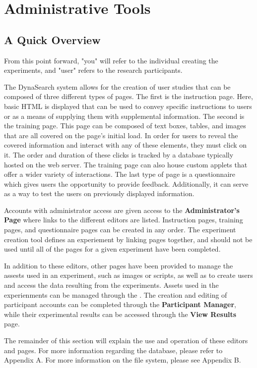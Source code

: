\documentclass[article]{ij4uq}              %
\begin{document}
\section{Administrative Tools}

\subsection{A Quick Overview}
From this point forward, "you" will refer to the individual creating the experiments, and "user" refers to the research participants. 

The DynaSearch system allows for the creation of user studies that can be composed of three different types of pages. The first is the instruction page. Here, basic HTML is displayed that can be used to convey specific instructions to users or as a means of supplying them with supplemental information. The second is the training page. This page can be composed of text boxes, tables, and images that are all covered on the page's initial load.  In order for users to reveal the covered information and interact with any of these elements, they must click on it. The order and duration of these clicks is tracked by a database typically hosted on the web server. The training page can also house custom applets that offer a wider variety of interactions.  The last type of page is a questionnaire which gives users the opportunity to provide feedback.  Additionally, it can serve as a way to test the users on previously displayed information.

Accounts with administrator access are given access to the \textbf{Administrator's Page} where links to the different editors are listed. Instruction pages, training pages, and questionnaire pages can be created in any order. The experiment creation tool defines an experiement by linking pages together, and should not be used until all of the pages for a given experiment have been completed.

In addition to these editors, other pages have been provided to manage the assests used in an experiment, such as images or scripts, as well as to create users and access the data resulting from the experiments.   Assets used in the experienments can be managed through the .  The creation and editing of participant accounts can be completed through the \textbf{Participant Manager}, while their experimental results can be accessed through the \textbf{View Results} page.

The remainder of this section will explain the use and operation of these editors and pages. For more information regarding the database, please refer to Appendix A. For more information on the file system, please see Appendix B.
\end{document}
